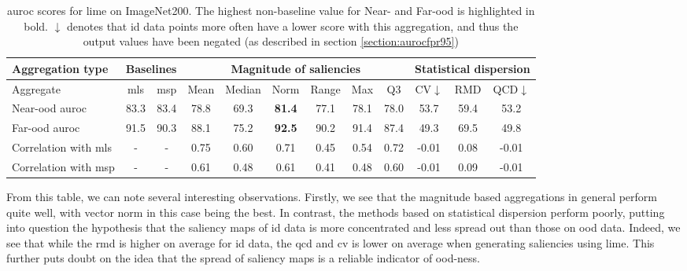 \documentclass[UKenglish]{uiomasterthesis} %
\theoremstyle{definition}
\begin{document}
\begin{table}[H]
\setlength\tabcolsep{3pt}
\begin{center}
\begin{tabular}{ |p{5.1em}|c c|c c c c c c|c c c| }
    \hline
     \centering Aggregation type & \multicolumn{2}{c|}{Baselines} & \multicolumn{6}{c|}{Magnitude of saliencies} & \multicolumn{3}{p{8em}|}{\centering Statistical dispersion} \\
    \hline
    Aggregate & \ac{mls} & \ac{msp} & Mean & Median & Norm & Range & Max & Q3 & CV$\downarrow$ & RMD & QCD$\downarrow$  \\
    \hline
    \rowcolor{near!50}
    Near-\ac{ood} \ac{auroc} & 83.3 & 83.4 & 78.8 & 69.3 &\textbf{ 81.4 }& 77.1 & 78.1 & 78.0 & 53.7 & 59.4 & 53.2  \\
    \hline
    \rowcolor{far!50}
    Far-\ac{ood} \ac{auroc} & 91.5 & 90.3 & 88.1 & 75.2 &\textbf{ 92.5 }& 90.2 & 91.4 & 87.4 & 49.3 & 69.5 & 49.8  \\
    \hline
    Correlation with \ac{mls}& - & - & 0.75 & 0.60 & 0.71 & 0.45 & 0.54 & 0.72 & -0.01 & 0.08 & -0.01  \\
    \hline
    Correlation with \ac{msp}& - & - & 0.61 & 0.48 & 0.61 & 0.41 & 0.48 & 0.60 & -0.01 & 0.09 & -0.01  \\
    \hline
    \end{tabular}
    \caption[\ac{auroc} scores for \ac{lime} on ImageNet200]{\ac{auroc} scores for \ac{lime} on ImageNet200. The highest non-baseline value for Near- and Far-\ac{ood} is highlighted in bold. $\downarrow$ denotes that \ac{id} data points more often have a lower score with this aggregation, and thus the output values have been negated (as described in section \ref{section:aurocfpr95})}
    \label{table:imagenet200_lime_metrics}
\end{center}
\setlength\tabcolsep{6pt}
\end{table}


From this table, we can note several interesting observations. Firstly, we see that the magnitude based aggregations in general perform quite well, with vector norm in this case being the best. In contrast, the methods based on statistical dispersion perform poorly, putting into question the hypothesis that the saliency maps of \ac{id} data is more concentrated and less spread out than those on \ac{ood} data. Indeed, we see that while the \ac{rmd} is higher on average for \ac{id} data, the \ac{qcd} and \ac{cv} is lower on average when generating saliencies using \ac{lime}. This further puts doubt on the idea that the spread of saliency maps is a reliable indicator of \ac{ood}-ness.
\end{document}
